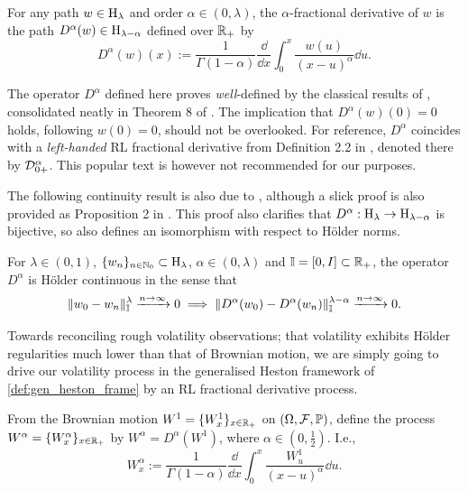 \begin{definition}\label{def:RL_deriv}
    For any path $w\in\mathrm{H}_\lambda$ and order $\alpha\in(0,\lambda)$, the $\alpha$-fractional derivative of $w$ is the path $D^\alpha(w)\in\mathrm{H}_{\lambda-\alpha}$ defined over $\mathbb{R}_+$ by
    \begin{equation}\label{eq:RL_deriv}
        D^\alpha(w)(x) := \frac{1}{\Gamma(1-\alpha)}\frac{\dd}{\dd x}\int_0^x \frac{w(u)}{(x-u)^{\alpha}}\dd u.
    \end{equation}
\end{definition}

The operator $D^\alpha$ defined here proves \emph{well}-defined by the classical results of \cite{hardy_1928}, consolidated neatly in Theorem 8 of \cite{hamadouche_2000}. The implication that $D^\alpha(w)(0)=0$ holds, following $w(0)=0$, should not be overlooked. For reference, $D^\alpha$ coincides with a \emph{left-handed} RL fractional derivative from Definition 2.2 in \cite{samko_1993}, denoted there by $\mathcal{D}^\alpha_{0+}$. This popular text is however not recommended for our purposes.

The following continuity result is also due to \cite{hardy_1928}, although a slick proof is also provided as Proposition 2 in \cite{hamadouche_2000}. This proof also clarifies that $D^\alpha:\mathrm{H}_\lambda\to\mathrm{H}_{\lambda-\alpha}$ is bijective, so also defines an isomorphism with respect to H\"older norms.

\begin{theorem}\label{thm:fractional_continuity}
    For $\lambda\in(0,1)$, $\{w_n\}_{n\in\mathbb{N}_0}\subset\mathrm{H}_\lambda$, $\alpha\in(0,\lambda)$ and $\mathbb{I}=[0,I]\subset\mathbb{R}_+$, the operator $D^\alpha$ is H\"older continuous in the sense that
    \begin{equation}
        \Vert w_0 - w_n \Vert^\lambda_{\mathbb{I}}\xrightarrow{n\to\infty}0 \implies \Vert D^\alpha(w_0) - D^\alpha(w_n) \Vert^{\lambda-\alpha}_{\mathbb{I}}\xrightarrow{n\to\infty}0.
    \end{equation}
\end{theorem}

Towards reconciling rough volatility observations; that volatility exhibits H\"older regularities much lower than that of Brownian motion, we are simply going to drive our volatility process in the generalised Heston framework of \autoref{def:gen_heston_frame} by an RL fractional derivative process.

\begin{definition}\label{def:RL_process}
    From the Brownian motion $W^1=\{W^1_x\}_{x\in\mathbb{R}_+}$ on $(\Omega,\mathcal{F},\mathbb{P})$, define the process $W^\alpha=\{W^\alpha_x\}_{x\in\mathbb{R}_+}$ by $W^\alpha=D^\alpha(W^1)$, where $\alpha\in(0,\frac12)$. I.e.,
    \begin{equation}\label{eq:RL_process}
        W^\alpha_x := \frac{1}{\Gamma(1-\alpha)}\frac{\dd}{\dd x}\int_0^x \frac{W^1_u}{(x-u)^{\alpha}}\dd u.
    \end{equation}
\end{definition}


